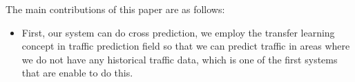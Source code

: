 The main contributions of this paper are as follows:
\begin{itemize}
\item First, our system can do cross prediction, we employ the transfer learning concept
in traffic prediction field so that we can predict traffic in areas where we do not have any historical traffic data, which is one of the first systems that are enable to do this.









\end{itemize}
